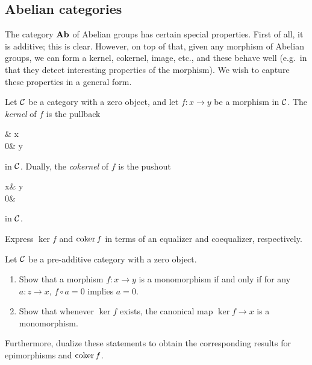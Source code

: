 \subsection{Abelian categories}
The category \(\mathbf{Ab}\) of Abelian groups has certain special properties. First of all, it is additive; this is clear. However, on top of that, given any morphism of Abelian groups,
we can form a kernel, cokernel, image, etc., and these behave well (e.g.\ in that they detect interesting properties of the morphism). We wish to capture these properties
in a general form.
\begin{definition}
	Let \(\mathcal{C}\) be a category with a zero object, and let \(f\!:x\to y\) be a morphism in \(\mathcal{C}\). The \emph{kernel} of \(f\) is the pullback
	\begin{diagram*}
		\ar[r,dashed]\ar[d,dashed]\ar[dr, pullback] & x\ar[d,"f"] \\
		0\ar[r] & y
	\end{diagram*}
	in \(\mathcal{C}\). Dually, the \emph{cokernel} of \(f\) is the pushout
	\begin{diagram*}
		x\ar[r,"f"]\ar[d] & y \ar[d,dashed] \\
		0\ar[r,dashed] & \ar[ul,pushout]
	\end{diagram*}
	in \(\mathcal{C}\).
\end{definition}
\begin{exercise}
	Express \(\ker{f}\) and \(\operatorname{coker}{f}\) in terms of an equalizer and coequalizer, respectively.
\end{exercise}
\begin{exercise}\label{exercise:kernel-map-monomorphism}
	Let \(\mathcal{C}\) be a pre-additive category with a zero object.
	\begin{enumerate}[label=(\arabic*)]
	\item Show that a morphism \(f\!:x\to y\) is a monomorphism if and only if for any \(a\!:z\to x\), \(f\circ a = 0\) implies \(a = 0\).
	\item Show that whenever \(\ker{f}\) exists, the canonical map \(\ker{f}\to x\) is a monomorphism.
	\end{enumerate}
	Furthermore, dualize these statements to obtain the corresponding results for epimorphisms and \(\operatorname{coker}{f}\).
\end{exercise}

